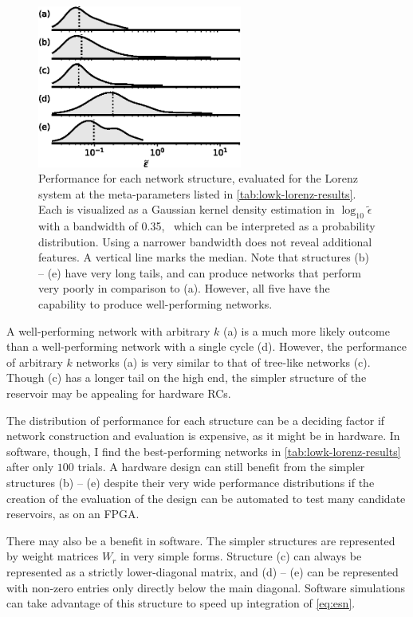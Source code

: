 \begin{figure}
  \includegraphics[width=0.6\textwidth]{figures/epsilon-distribution}
  \caption{Performance for each network structure, evaluated for the
    Lorenz system at the meta-parameters listed in
    \cref{tab:lowk-lorenz-results}. Each is visualized as a Gaussian
    kernel density estimation in $\log_{10} \tilde{\epsilon}$ with a bandwidth
    of 0.35,~\cite{scott1992} which can be interpreted as a probability
    distribution. Using a narrower bandwidth does not reveal
    additional features. A vertical line marks the median.  Note that
    structures (b) -- (e) have very long tails, and can produce
    networks that perform very poorly in comparison to (a). However,
    all five have the capability to produce well-performing
    networks.}%
  \label{fig:epsilon-distribution}
\end{figure}

A well-performing network with arbitrary $k$ (a) is a much more
likely outcome than a well-performing network with a single cycle
(d). However, the performance of arbitrary $k$ networks (a) is very
similar to that of tree-like networks (c). Though (c) has a longer
tail on the high end, the simpler structure of the reservoir may be
appealing for hardware RCs.

The distribution of performance for each structure can be a deciding
factor if network construction and evaluation is expensive, as it
might be in hardware. In software, though, I find the
best-performing networks in \cref{tab:lowk-lorenz-results} after only $100$
trials. A hardware design can still benefit from the simpler
structures (b) -- (e) despite their very wide performance distributions
if the creation of the evaluation of the design can be automated to
test many candidate reservoirs, as on an FPGA.~\cite{canaday2018}

There may also be a benefit in software. The simpler structures are
represented by weight matrices $W_r$ in very simple forms. Structure
(c) can always be represented as a strictly lower-diagonal matrix, and
(d) -- (e) can be represented with non-zero entries only directly below
the main diagonal. Software simulations can take advantage of this structure to
speed up integration of \cref{eq:esn}.

